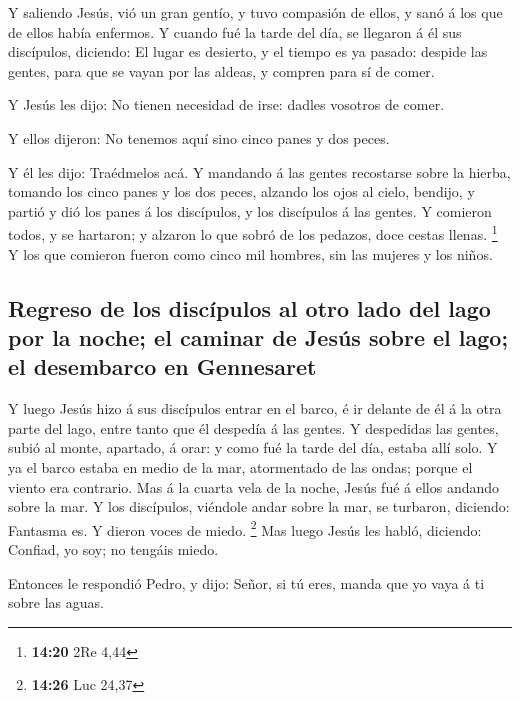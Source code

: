  Y saliendo Jesús, vió un gran gentío, y tuvo compasión de
ellos, y sanó á los que de ellos había enfermos.  Y cuando
fué la tarde del día, se llegaron á él sus discípulos, diciendo: El
lugar es desierto, y el tiempo es ya pasado: despide las gentes, para
que se vayan por las aldeas, y compren para sí de comer.

 Y Jesús les dijo: No tienen necesidad de irse: dadles
vosotros de comer.

 Y ellos dijeron: No tenemos aquí sino cinco panes y dos
peces.

 Y él les dijo: Traédmelos acá.  Y mandando á
las gentes recostarse sobre la hierba, tomando los cinco panes y los dos
peces, alzando los ojos al cielo, bendijo, y partió y dió los panes á
los discípulos, y los discípulos á las gentes.  Y comieron
todos, y se hartaron; y alzaron lo que sobró de los pedazos, doce cestas
llenas. \footnote{\textbf{14:20} 2Re 4,44}  Y los que
comieron fueron como cinco mil hombres, sin las mujeres y los niños.

\hypertarget{regreso-de-los-discuxedpulos-al-otro-lado-del-lago-por-la-noche-el-caminar-de-jesuxfas-sobre-el-lago-el-desembarco-en-gennesaret}{%
\subsection{Regreso de los discípulos al otro lado del lago por la
noche; el caminar de Jesús sobre el lago; el desembarco en
Gennesaret}\label{regreso-de-los-discuxedpulos-al-otro-lado-del-lago-por-la-noche-el-caminar-de-jesuxfas-sobre-el-lago-el-desembarco-en-gennesaret}}

 Y luego Jesús hizo á sus discípulos entrar en el barco, é
ir delante de él á la otra parte del lago, entre tanto que él despedía á
las gentes.  Y despedidas las gentes, subió al monte,
apartado, á orar: y como fué la tarde del día, estaba allí solo.
 Y ya el barco estaba en medio de la mar, atormentado de
las ondas; porque el viento era contrario.  Mas á la cuarta
vela de la noche, Jesús fué á ellos andando sobre la mar. 
Y los discípulos, viéndole andar sobre la mar, se turbaron, diciendo:
Fantasma es. Y dieron voces de miedo. \footnote{\textbf{14:26} Luc 24,37}
 Mas luego Jesús les habló, diciendo: Confiad, yo soy; no
tengáis miedo.

 Entonces le respondió Pedro, y dijo: Señor, si tú eres,
manda que yo vaya á ti sobre las aguas.

